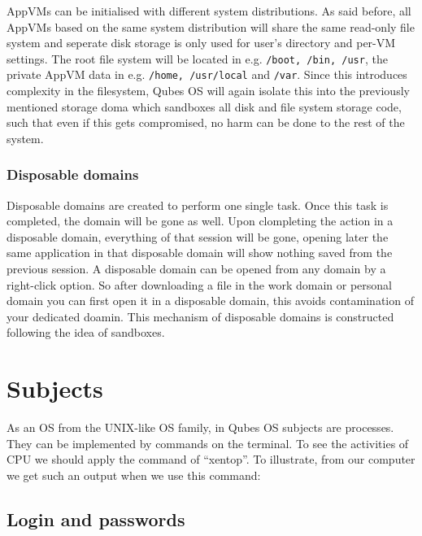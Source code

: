 \documentclass[runningheads,a4paper]{article}
\begin{document}
AppVMs can be initialised with different system
distributions. As said before, all AppVMs
based on the same system distribution will share the same read-only
file system and seperate disk storage is only used for user's
directory and per-VM settings. The root file system will be located in
e.g. \texttt{/boot, /bin, /usr}, the private AppVM data in
e.g. \texttt{/home, /usr/local} and \texttt{/var}. 
Since this introduces complexity in the
filesystem, Qubes OS will again isolate this into the previously
mentioned storage doma which sandboxes
all disk and file system storage code, such that even if this gets
compromised, no harm can be done to the rest of the system.

\subsubsection{Disposable domains}

Disposable domains are created to perform one single task. Once this
task is completed, the domain will be gone as well. Upon clompleting
the action in a disposable domain, everything of that session will be
gone, opening later the same application in that disposable domain
will show nothing saved from the previous session. A disposable domain
can be opened from any domain by a right-click option. So after
downloading a file in the work domain or personal domain you can first
open it in a disposable domain, this avoids contamination of your
dedicated doamin. This mechanism of disposable domains is constructed
following the idea of sandboxes.


\section{Subjects}

As an OS from the UNIX-like OS family, in Qubes OS
subjects are processes. They can be implemented by commands on the
terminal. To see the activities of CPU we should apply the command of
“xentop”. To illustrate, from our computer we get such an output when
we use this command:

\subsection{Login and passwords} 
\end{document}
